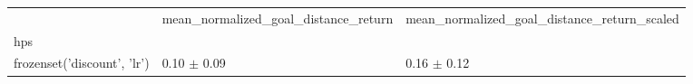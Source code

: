 \begin{tabular}{lll}
\toprule
 & mean_normalized_goal_distance_return & mean_normalized_goal_distance_return_scaled \\
hps &  &  \\
\midrule
frozenset({'discount', 'lr'}) & 0.10 $\pm$ 0.09 & 0.16 $\pm$ 0.12 \\
\bottomrule
\end{tabular}
